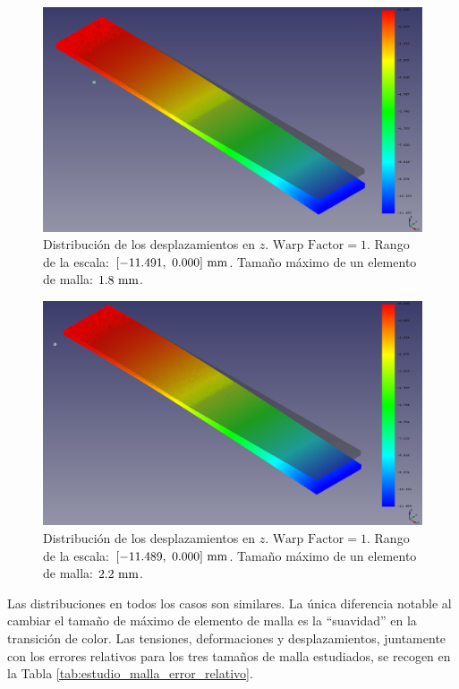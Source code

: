 \begin{figure}[H]
    \centering
    \includegraphics[width=\textwidth]{figures/resultados/displacement_vector_z_18_3d.pdf}
    \caption{Distribución de los desplazamientos en $z$. $\text{Warp Factor} = 1$. Rango de la escala: $[-11.491, \ 0.000] \ \milli\meter$. Tamaño máximo de un elemento de malla: $1.8 \ \milli\meter$.}
    \label{fig:displacement_vector_z_18_3d}
\end{figure}

\begin{figure}[H]
    \centering
    \includegraphics[width=\textwidth]{figures/resultados/displacement_vector_z_22_3d.pdf}
    \caption{Distribución de los desplazamientos en $z$. $\text{Warp Factor} = 1$. Rango de la escala: $[-11.489, \ 0.000] \ \milli\meter$. Tamaño máximo de un elemento de malla: $2.2 \ \milli\meter$.}
    \label{fig:displacement_vector_z_22_3d}
\end{figure}

Las distribuciones en todos los casos son similares. La única diferencia notable al cambiar el tamaño de máximo de elemento de malla es la ``suavidad'' en la transición de color. Las tensiones, deformaciones y desplazamientos, juntamente con los errores relativos para los tres tamaños de malla estudiados, se recogen en la Tabla \ref{tab:estudio_malla_error_relativo}.

